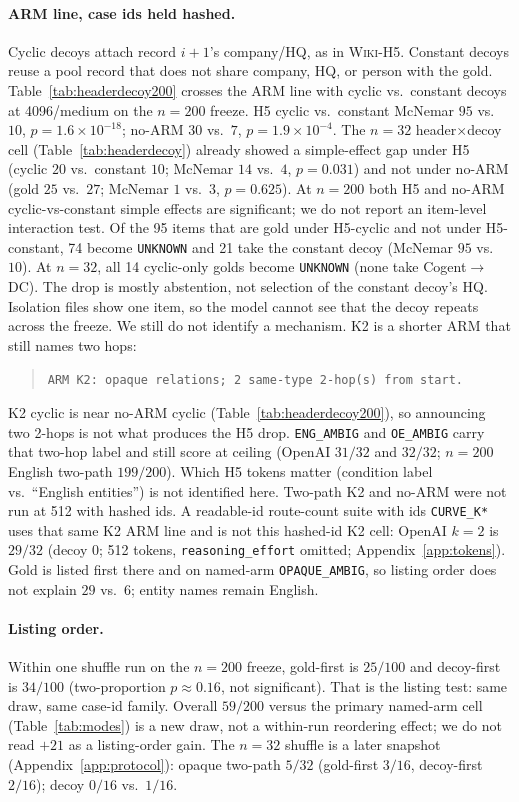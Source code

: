 \documentclass{article}
\begin{document}
\paragraph{ARM line, case ids held hashed.}
Cyclic decoys attach record $i{+}1$'s company/HQ, as in \textsc{Wiki-H5}.
Constant decoys reuse a pool record that does not share company, HQ, or
person with the gold.
Table~\ref{tab:headerdecoy200} crosses the ARM line with cyclic vs.\
constant decoys at 4096/medium on the $n{=}200$ freeze.
H5 cyclic vs.\ constant McNemar $95$ vs.\ $10$,
$p{=}1.6{\times}10^{-18}$; no-ARM $30$ vs.\ $7$, $p{=}1.9{\times}10^{-4}$.
The $n{=}32$ header$\times$decoy cell (Table~\ref{tab:headerdecoy}) already showed a
simple-effect gap under H5 (cyclic $20$ vs.\ constant $10$; McNemar
$14$ vs.\ $4$, $p{=}0.031$) and not under no-ARM (gold $25$ vs.\ $27$;
McNemar $1$ vs.\ $3$, $p{=}0.625$).
At $n{=}200$ both H5 and no-ARM cyclic-vs-constant simple effects are
significant; we do not report an item-level interaction test.
Of the 95 items that are gold under H5-cyclic and not under H5-constant,
74 become \texttt{UNKNOWN} and 21 take the constant decoy
(McNemar $95$ vs.\ $10$).
At $n{=}32$, all 14 cyclic-only golds become \texttt{UNKNOWN} (none take
Cogent$\to$DC).
The drop is mostly abstention, not selection of the constant decoy's HQ.
Isolation files show one item, so the model cannot see that the decoy
repeats across the freeze.
We still do not identify a mechanism.
K2 is a shorter ARM that still names two hops:
\begin{quote}
\small
\texttt{ARM K2: opaque relations; 2 same-type 2-hop(s) from start.}
\end{quote}
K2 cyclic is near no-ARM cyclic
(Table~\ref{tab:headerdecoy200}), so announcing two 2-hops is not what
produces the H5 drop.
\texttt{ENG\_AMBIG} and \texttt{OE\_AMBIG} carry that two-hop label and
still score at ceiling (OpenAI $31/32$ and $32/32$; $n{=}200$ English
two-path $199/200$).
Which H5 tokens matter (condition label vs.\
``English entities'') is not identified here.
Two-path K2 and no-ARM were not run at 512 with hashed ids.
A readable-id route-count suite with ids \texttt{CURVE\_K*} uses that same K2
ARM line and is not this hashed-id K2 cell: OpenAI $k{=}2$ is $29/32$
(decoy $0$; 512 tokens, \texttt{reasoning\_effort} omitted;
Appendix~\ref{app:tokens}).
Gold is listed first there and on named-arm \texttt{OPAQUE\_AMBIG}, so
listing order does not explain $29$ vs.\ $6$; entity names remain English.

\paragraph{Listing order.}
Within one shuffle run on the $n{=}200$ freeze, gold-first is $25/100$ and
decoy-first is $34/100$ (two-proportion $p{\approx}0.16$, not significant).
That is the listing test: same draw, same case-id family.
Overall $59/200$ versus the primary named-arm cell (Table~\ref{tab:modes}) is a new draw,
not a within-run reordering effect; we do not read ${+}21$ as a listing-order gain.
The $n{=}32$ shuffle is a later snapshot
(Appendix~\ref{app:protocol}): opaque two-path $5/32$
(gold-first $3/16$, decoy-first $2/16$); decoy $0/16$ vs.\ $1/16$.
\end{document}
